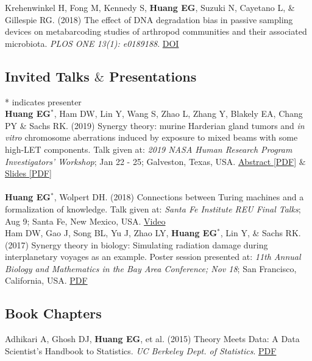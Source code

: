 \documentclass[10pt, letterpaper]{article}
\newcommand{\years}[1]{\marginnote{\scriptsize #1}}
\begin{document}
\years{2018}Krehenwinkel H, Fong M, Kennedy S, \textbf{Huang EG}, Suzuki N, Cayetano L, \& Gillespie RG. (2018) The effect of DNA degradation bias in passive sampling devices on metabarcoding studies of arthropod communities and their associated microbiota. \emph{PLOS ONE 13(1): e0189188}. \href{https://doi.org/10.1371/journal.pone.0189188}{DOI} \\

\subsection*{Invited Talks $\&$ Presentations}
* indicates presenter\\


\noindent
\years{2019}\textbf{Huang EG}$^{*}$, Ham DW, Lin Y, Wang S, Zhao L, Zhang Y, Blakely EA, Chang PY $\&$ Sachs RK. (2019) Synergy theory: murine Harderian gland tumors and \textit{in vitro} chromosome aberrations induced by exposure to mixed beams with some high-LET components. Talk given at: \emph{2019 NASA Human Research Program Investigators' Workshop}; Jan 22 - 25; Galveston, Texas, USA. \href{https://nbviewer.jupyter.org/github/sachsURAP/NASA_HRP_2019/blob/master/hrp_abstract.pdf}{Abstract [PDF]} $ \& $ \href{https://nbviewer.jupyter.org/github/sachsURAP/NASA_HRP_2019/blob/master/hrp_slides.pdf}{Slides [PDF]} \\
\\

\years{2018}\textbf{Huang EG}$^{*}$, Wolpert DH. (2018) Connections between Turing machines and a formalization of knowledge. Talk given at: \emph{Santa Fe Institute REU Final Talks}; Aug 9; Santa Fe, New Mexico, USA. \href{https://www.youtube.com/watch?v=10bi_R47uYw&list=PLZlVBTf7N6GpTwEeQOlOmIfYN5J7zciZR&index=6&t=0s}{Video}\\

\years{2017}Ham DW, Gao J, Song BL, Yu J, Zhao LY, \textbf{Huang EG}$^{*}$, Lin Y, \& Sachs RK. (2017) Synergy theory in biology: Simulating radiation damage during interplanetary voyages as an example. Poster session presented at: \emph{11th Annual Biology and Mathematics in the Bay Area Conference; Nov 18}; San Francisco, California, USA. \href{https://nbviewer.jupyter.org/github/sachsURAP/BaMBA_11/blob/master/Bamba17v3.pdf}{PDF}\\

\subsection*{Book Chapters}
\noindent
\years{2015}Adhikari A, Ghosh DJ, \textbf{Huang EG}, et al. (2015) Theory Meets Data: A Data Scientist’s Handbook to Statistics. \emph{UC Berkeley Dept. of Statistics}. {\href{https://nbviewer.jupyter.org/github/eghuang/theory_meets_data/blob/master/theory-meets-data.pdf}{PDF}}\\
\end{document}

